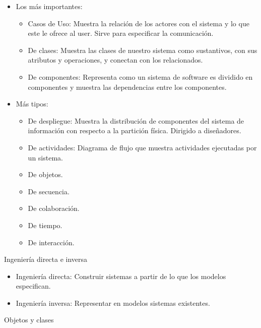 \documentclass[12pt, twoside, openright]{report} %
\begin{document}
\begin{itemize}
	\item Los más importantes:

	      \begin{itemize}
		      \item Casos de Uso: Muestra la relación de los actores con el sistema
		            y lo que este le ofrece al user. Sirve para especificar la
		            comunicación.
		      \item De clases: Muestra las clases de nuestro sistema como
		            sustantivos, con sus atributos y operaciones, y conectan con los
		            relacionados.
		      \item De componentes: Representa como un sistema de software es
		            dividido en componentes y muestra las dependencias entre los
		            componentes.
	      \end{itemize}
	\item Más tipos:

	      \begin{itemize}
		      \item De despliegue: Muestra la distribución de componentes del
		            sistema de información con respecto a la partición física.
		            Dirigido a diseñadores.
		      \item De actividades: Diagrama de flujo que muestra actividades
		            ejecutadas por un sistema.
		      \item De objetos.
		      \item De secuencia.
		      \item De colaboración.
		      \item De tiempo.
		      \item De interacción.
	      \end{itemize}
\end{itemize}

Ingeniería directa e inversa
\vspace{-0.5cm}
\begin{itemize}
	\item Ingeniería directa: Construir sistemas a partir de lo que los
	      modelos especifican.
	\item Ingeniería inversa: Representar en modelos sistemas existentes.
\end{itemize}

Objetos y clases
\vspace{-0.5cm}
\end{document}
